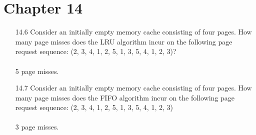 \section{Chapter 14}

\begin{itemize}

      \item[14.6]Consider an initially empty memory cache consisting of four pages. How
            many page misses does the LRU algorithm incur on the following page
            request sequence: (2, 3, 4, 1, 2, 5, 1, 3, 5, 4, 1, 2, 3)?\\
            \answer \\
            5 page misses.
      \item[14.7] Consider an initially empty memory cache consisting of four pages. How
            many page misses does the FIFO algorithm incur on the following page
            request sequence: (2, 3, 4, 1, 2, 5, 1, 3, 5, 4, 1, 2, 3) \\
            \answer \\
            3 page misses.

\end{itemize}